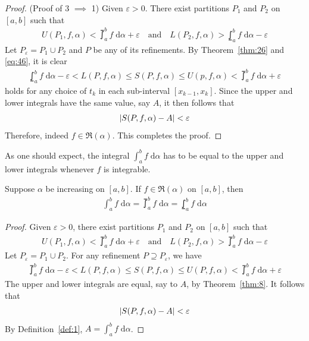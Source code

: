 \documentclass[thmcnt=section, 12pt]{my-elegantbook}
\begin{document}
\begin{proof}
    (Proof of 3 $\implies$ 1) Given $\varepsilon > 0$. There exist partitions $P_1$ and $P_2$ on $[a, b]$ such that 
    \begin{align*}
        U(P_1,f,\alpha) < \upint_a^b f \; \mathrm{d}\alpha + \varepsilon
        \quad \text{and} \quad 
        L(P_2,f,\alpha) > \lowint_a^b f \; \mathrm{d}\alpha - \varepsilon
    \end{align*}
    Let $P_\varepsilon = P_1 \cup P_2$ and $P$ be any of its refinements. By Theorem~\ref{thm:26} and \eqref{eq:46}, it is clear
    \begin{align*}
        \lowint_a^b f \; \mathrm{d}\alpha - \varepsilon
        < L(P,f,\alpha)
        \leq S(P,f,\alpha)
        \leq U(p,f,\alpha)
        < \upint_a^b f \; \mathrm{d}\alpha + \varepsilon
    \end{align*}
    holds for any choice of $t_k$ in each sub-interval $[x_{k-1}, x_k]$. Since the upper and lower integrals have the same value, say $A$, it then follows that 
    \begin{align*}
        \left\lvert S(P,f,\alpha) - A \right\rvert < \varepsilon
    \end{align*}
    Therefore, indeed $f \in \mathfrak{R}(\alpha)$. This completes the proof.
\end{proof}

As one should expect, the integral $\int_{a}^{b} f \; \mathrm{d}\alpha$ has to be equal to the upper and lower integrals whenever $f$ is integrable.

\begin{corollary}
    Suppose $\alpha$ be increasing on $[a, b]$. If $f \in \mathfrak{R}(\alpha)$ on $[a, b]$, then 
    \begin{align*}
        \int_{a}^{b} f \; \mathrm{d}\alpha
        = \upint_{a}^{b} f \; \mathrm{d}\alpha
        = \lowint_{a}^{b} f \; \mathrm{d}\alpha
    \end{align*}
\end{corollary}

\begin{proof}
    Given $\varepsilon > 0$, there exist partitions $P_1$ and $P_2$ on $[a, b]$ such that 
    \begin{align*}
        U(P_1,f,\alpha) < \upint_{a}^{b} f \; \mathrm{d}\alpha + \varepsilon
        \quad\text{and}\quad
        L(P_2,f,\alpha) > \upint_{a}^{b} f \; \mathrm{d}\alpha - \varepsilon
    \end{align*}
    Let $P_\varepsilon = P_1 \cup P_2$. For any refinement $P \supseteq P_\varepsilon$, we have 
    \begin{align*}
        \upint_{a}^{b} f \; \mathrm{d}\alpha - \varepsilon
        < L(P,f,\alpha)
        \leq S(P,f,\alpha)
        \leq U(P,f,\alpha)
        < \upint_{a}^{b} f \; \mathrm{d}\alpha + \varepsilon
    \end{align*}
    The upper and lower integrals are equal, say to $A$, by Theorem~\ref{thm:8}. It follows that 
    \begin{align*}
        \left\lvert S(P,f,\alpha) - A \right\rvert < \varepsilon
    \end{align*}
    By Definition~\ref{def:1}, $A = \int_{a}^{b} f \; \mathrm{d}\alpha$.
\end{proof}
\end{document}

